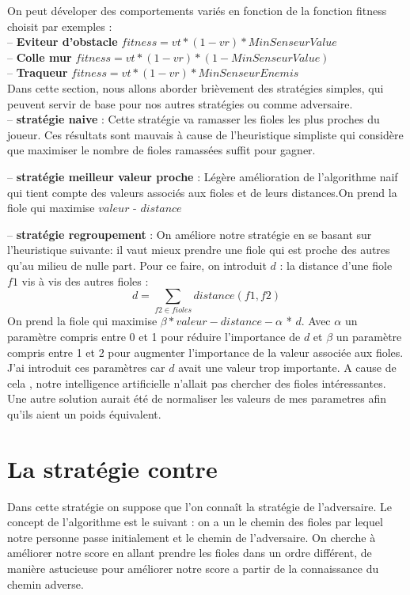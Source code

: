 \documentclass[11pt]{article}
\begin{document}
On peut déveloper des comportements variés en fonction de la fonction fitness choisit par exemples : \\

-- \textbf {Eviteur d'obstacle} $fitness=vt*(1-vr)*MinSenseurValue$ \\
-- \textbf {Colle mur} $fitness=vt*(1-vr)*(1-MinSenseurValue)$ \\
-- \textbf {Traqueur} $fitness=vt*(1-vr)*MinSenseurEnemis$ \\

Dans cette section, nous allons aborder brièvement des stratégies simples, qui peuvent servir de base pour nos autres stratégies ou comme adversaire. \\
-- \textbf {stratégie naive} : Cette stratégie va ramasser les fioles les plus proches du joueur. Ces résultats sont mauvais à cause de l'heuristique simpliste qui considère que maximiser le nombre de fioles ramassées suffit pour gagner.

-- \textbf {stratégie meilleur valeur proche} : Légère amélioration de l'algorithme naif qui tient compte des valeurs associés aux fioles et de leurs distances.On prend la fiole qui maximise $valeur$ - $distance$

-- \textbf {stratégie regroupement} : On améliore notre stratégie en se basant sur l'heuristique suivante: il vaut mieux prendre une fiole qui est proche des autres qu'au milieu de nulle part. Pour ce faire, on introduit $d$ : la distance d'une fiole $f1$ vis à vis des autres fioles : \\
\[ d = \sum_{f2 \in fioles} distance(f1,f2) \]
On prend la fiole qui maximise $\beta*valeur -distance - \alpha$ * $d$. Avec $\alpha$ un paramètre compris entre 0 et 1 pour réduire l'importance de $d$ et $\beta$ un paramètre compris entre 1 et 2 pour augmenter l'importance de la valeur associée aux fioles. J'ai introduit ces paramètres car $d$ avait une valeur trop importante. A cause de cela , notre intelligence artificielle n'allait pas chercher des fioles intéressantes. Une autre solution aurait été de normaliser les valeurs de mes parametres afin qu'ils aient un poids équivalent.

\section{La stratégie contre}

Dans cette stratégie on suppose que l'on connaît la stratégie de l'adversaire.
Le concept de l'algorithme est le suivant : on a un le chemin des fioles par lequel notre personne passe initialement et le chemin de l'adversaire. On cherche à améliorer notre score en allant prendre les fioles dans un ordre différent, de manière astucieuse pour améliorer notre score a partir de la connaissance du chemin adverse.
\end{document}
